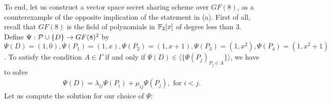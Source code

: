 To end, let us construct a vector space secret sharing scheme over $GF(8)$, as a counterexample of the opposite implication of the statement in (a).
First of all, recall that $GF(8)$ is the field of polynomials in $\F_2[x]$ of degree less than 3.
Define $\Psi : \P\cup\{D\} \to GF(8)^2$ by $\Psi(D) = (1, 0), \Psi(P_1) = (1, x), \Psi(P_2) = (1, x+1), \Psi(P_3) = (1, x^2), \Psi(P_4) = (1, x^2+1)$.
To satisfy the condition $A\in\Gamma$ if and only if $\Psi(D)\in\langle \{\Psi(P_j)_{P_j\in A}\}\rangle$, we have to solve
\begin{equation*}
    \begin{split}
        \Psi(D) = \lambda_{ij}\Psi(P_i) + \mu_{ij}\Psi(P_j), \text{ for } i < j.
    \end{split}
\end{equation*}
Let us compute the solution for our choice of $\Psi$:
